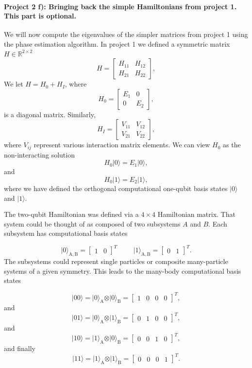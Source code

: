 \documentclass[%
oneside,                 %
final,                   %
10pt]{article}
\begin{document}
\paragraph{Project 2 f): Bringing back the simple Hamiltonians from project 1. This part is optional.}
We will now compute the eigenvalues of the simpler matrices from project 1 using the phase estimation algorithm.
In project 1 we defined a  symmetric matrix  $H\in {\mathbb{R}}^{2\times 2}$
\[
H = \begin{bmatrix} H_{11} & H_{12} \\ H_{21} & H_{22}
\end{bmatrix},
\]
We  let $H = H_0 + H_I$, where
\[
H_0= \begin{bmatrix} E_1 & 0 \\ 0 & E_2\end{bmatrix},
\]
is a diagonal matrix. Similarly,
\[
H_I= \begin{bmatrix} V_{11} & V_{12} \\ V_{21} & V_{22}\end{bmatrix},
\]
where $V_{ij}$ represent various interaction matrix elements.
We can view $H_0$ as the non-interacting solution
\begin{equation}
       H_0\vert 0 \rangle =E_1\vert 0 \rangle,
\end{equation}
and
\begin{equation}
       H_0\vert 1\rangle =E_2\vert 1\rangle,
\end{equation}
where we have defined the orthogonal computational one-qubit basis states $\vert 0\rangle$ and $\vert 1\rangle$.

The two-qubit Hamiltonian was defined via a $4\times 4$ Hamiltonian matrix.
That system could be thought of as composed of two subsystems
$A$ and $B$. Each subsystem has computational basis states

\[
\vert 0\rangle_{\mathrm{A,B}}=\begin{bmatrix} 1 & 0\end{bmatrix}^T \hspace{1cm} \vert 1\rangle_{\mathrm{A,B}}=\begin{bmatrix} 0 & 1\end{bmatrix}^T.
\]
The subsystems could represent single particles or composite many-particle systems of a given symmetry.
This leads to the many-body computational basis states

\[
\vert 00\rangle = \vert 0\rangle_{\mathrm{A}}\otimes \vert 0\rangle_{\mathrm{B}}=\begin{bmatrix} 1 & 0 & 0 &0\end{bmatrix}^T,
\]
and
\[
\vert 01\rangle = \vert 0\rangle_{\mathrm{A}}\otimes \vert 1\rangle_{\mathrm{B}}=\begin{bmatrix} 0 & 1 & 0 &0\end{bmatrix}^T,
\]
and
\[
\vert 10\rangle = \vert 1\rangle_{\mathrm{A}}\otimes \vert 0\rangle_{\mathrm{B}}=\begin{bmatrix} 0 & 0 & 1 &0\end{bmatrix}^T,
\]
and finally
\[
\vert 11\rangle = \vert 1\rangle_{\mathrm{A}}\otimes \vert 1\rangle_{\mathrm{B}}=\begin{bmatrix} 0 & 0 & 0 &1\end{bmatrix}^T.
\]
\end{document}
